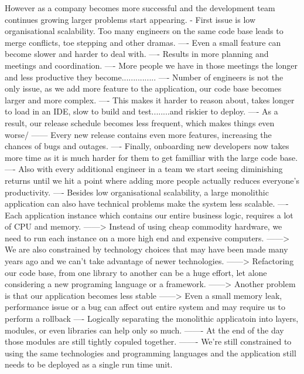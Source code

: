 \documentclass[a4paper, 11pt]{book}
\begin{document}
    However as a company becomes more successful and the development team continues growing larger problems start appearing.
    - First issue is low organisational scalability. Too many engineers on the same code base leads to merge conflicts, toe stepping and other dramas.
    ---- Even a small feature can become slower and harder to deal with.
    ---- Results in more planning and meetings and coordination.
    ---- More people we have in those meetings the longer and less productive they become...............
    ---- Number of engineers is not the only issue, as we add more feature to the application, our code base becomes larger and more complex.
    ---- This makes it harder to reason about, takes longer to load in an IDE, slow to build and test........and riskier to deploy.
    ---- As a result, our release schedule becomes less frequent, which makes things even worse/
    ------ Every new release contains even more features, increasing the chances of bugs and outages.
    ---- Finally, onboarding new developers now takes more time as it is much harder for them to get familliar with the large code base.
    ---- Also with every additional engineer in a team we start seeing diminishing returns until we hit a point where adding more people actually reduces everyone's productivity.
    ---- Besides low organisational scalability, a large monolithic application can also have technical problems make the system less scalable.
    ---- Each application instance which contains our entire business logic, requires a lot of CPU and memory.
    ------> Instead of using cheap commodity hardware, we need to run each instance on a more high end and expensive computers.
    ------> We are also constrained by technology choices that may have been made many years ago and we can't take advantage of newer technologies.
    ------> Refactoring our code base, from one library to another can be a huge effort, let alone considering a new programing language or a framework.
    ------> Another problem is that our application becomes less stable
    ------> Even a small memory leak, performance issue or a bug can affect out entire system and may require us to perform a rollback
    ---- Logically separating the monolithic applicatoin into layers, modules, or even libraries can help only so much.
    ------- At the end of the day those modules are still tightly copuled together.
    ------- We're still constrained to using the same technologies and programming languages and the application still needs to be deployed as a single run time unit.
\end{document}
